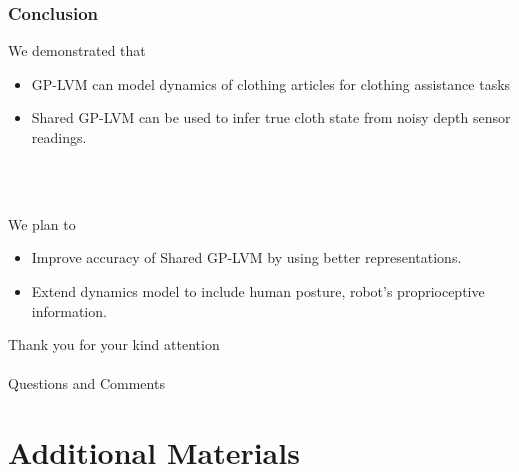 \documentclass[10pt,handout]{beamer}
\begin{document}
\begin{frame}
\frametitle{Conclusion}

\begin{block}{We demonstrated that}
\begin{itemize}
  \item GP-LVM can model dynamics of clothing articles for clothing assistance tasks
  \item Shared GP-LVM can be used to infer true cloth state from noisy depth sensor readings.
\end{itemize}
\end{block}

~\\~\\

\begin{block}{We plan to}
\begin{itemize}
  \item Improve accuracy of Shared GP-LVM by using better representations.
  \item Extend dynamics model to include human posture, robot's proprioceptive information.
\end{itemize}
\end{block}

\end{frame}

\begin{frame}
  \begin{center}
    \Large{Thank you for your kind attention}\\~\\
    \Large{Questions and Comments}
  \end{center}
\end{frame}


\section*{Additional Materials}
\end{document}
